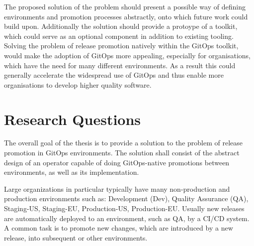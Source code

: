 
%
The proposed solution of the problem should
present a possible way of defining environments and promotion processes abstractly,
onto which future work could build upon.
%
Additionally the solution should
provide a protoype of a toolkit,
which could serve as an optional component
in addition to existing tooling.
%
Solving the problem of release promotion natively within the GitOps toolkit,
would make the adoption of GitOps more appealing,
especially for organisations, which have the need for many different environments.
%
As a result
this could generally accelerate the widespread use of GitOps
and thus enable more organisations to develop higher quality software.
%








\section{Research Questions}
\label{introduction:research-question}











%

The overall goal of the thesis is to
provide a solution to the problem of release promotion in GitOps environments.
The solution shall consist of the abstract design of an operator capable of doing
GitOps-native promotions between environments, as well as its implementation.

Large organizations in particular typically have many
non-production and production environments
such as:
Development (Dev),
Quality Assurance (QA),
Staging-US,
Staging-EU,
Production-US,
Production-EU.
Usually new releases are automatically deployed to an environment,
such as QA, 
by a CI/CD system.
A common task is to promote
new changes, which are introduced by a new release,
into subsequent or other environments.

